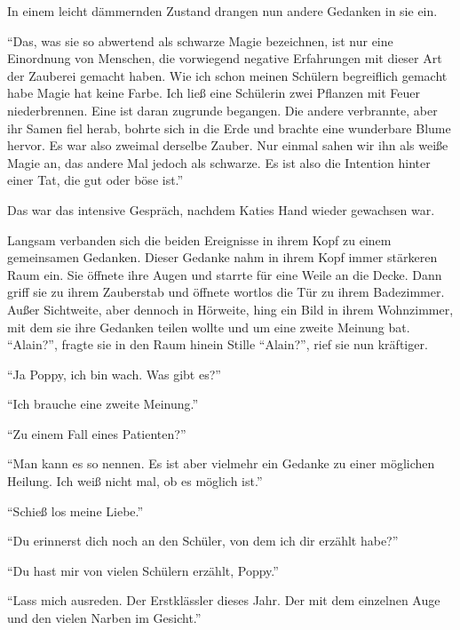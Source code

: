In einem leicht dämmernden Zustand drangen nun andere Gedanken in sie ein.

\begin{rueckblick}
\enquote{Das, was sie so abwertend als schwarze Magie bezeichnen, ist nur eine Einordnung von Menschen, die vorwiegend negative Erfahrungen mit dieser Art der Zauberei gemacht haben. Wie ich schon meinen Schülern begreiflich gemacht habe \gst Magie hat keine Farbe. Ich ließ eine Schülerin zwei Pflanzen mit Feuer niederbrennen. Eine ist daran zugrunde begangen. Die andere verbrannte, aber ihr Samen fiel herab, bohrte sich in die Erde und brachte eine wunderbare Blume hervor. Es war also zweimal derselbe Zauber. Nur einmal sahen wir ihn als weiße Magie an, das andere Mal jedoch als schwarze. Es ist also die Intention hinter einer Tat, die gut oder böse ist.}
\end{rueckblick}

Das war das intensive Gespräch, nachdem Katies Hand wieder gewachsen war.

Langsam verbanden sich die beiden Ereignisse in ihrem Kopf zu einem gemeinsamen Gedanken.  Dieser Gedanke nahm in ihrem Kopf immer stärkeren Raum ein. Sie öffnete ihre Augen und starrte für eine Weile an die Decke. Dann griff sie zu ihrem Zauberstab und öffnete wortlos die Tür zu ihrem Badezimmer. Außer Sichtweite, aber dennoch in Hörweite, hing ein Bild in ihrem Wohnzimmer, mit dem sie ihre Gedanken teilen wollte und um eine zweite Meinung bat. \enquote{Alain?}, fragte sie in den Raum hinein \gst Stille \gst \enquote{Alain?}, rief sie nun kräftiger.

\enquote{Ja Poppy, ich bin wach. Was gibt es?}

\enquote{Ich brauche eine zweite Meinung.}

\enquote{Zu einem Fall eines Patienten?}

\enquote{Man kann es so nennen. Es ist aber vielmehr ein Gedanke zu einer möglichen Heilung. Ich weiß nicht mal, ob es möglich ist.}

\enquote{Schieß los meine Liebe.}

\enquote{Du erinnerst dich noch an den Schüler, von dem ich dir erzählt habe\abs?}

\enquote{Du hast mir von vielen Schülern erzählt, Poppy.}

\enquote{Lass mich ausreden. Der Erstklässler dieses Jahr. Der mit dem einzelnen Auge und den vielen Narben im Gesicht.}

